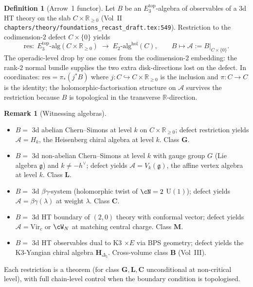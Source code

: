 \documentclass[11pt]{article}
\theoremstyle{definition}
\newtheorem{defn}[thm]{Definition}
\newtheorem{rem}[thm]{Remark}
\theoremstyle{remark}
\newcommand{\bR}{\mathbb{R}}
\newcommand{\cA}{\mathcal{A}}
\newcommand{\fg}{\mathfrak{g}}
\newcommand{\Etwo}{E_2}
\newcommand{\Ethree}{E_3}
\begin{document}
\begin{defn}[Arrow~1 functor]
Let $B$ be an $\Ethree^{\mathrm{top}}$-algebra of observables of a
$3$d HT theory on the slab $C \times \bR_{\geq 0}$ (Vol~II
\texttt{chapters/theory/foundations\_recast\_draft.tex:549}).
Restriction to the codimension-$2$ defect $C \times \{0\}$
yields
\[
\mathrm{res}\colon\;
\Ethree^{\mathrm{top}}\text{-alg}(C \times \bR_{\geq 0})
\;\longrightarrow\;
\Etwo\text{-alg}^{\mathrm{hol}}(C),
\qquad
B \longmapsto \cA := B|_{C \times \{0\}}.
\]
The operadic-level drop by one comes from the codimension-$2$
embedding: the rank-$2$ normal bundle supplies the two extra
disk-directions lost on the defect. In coordinates:
$\mathrm{res} = \pi_*(j^* B)$ where $j\colon C \hookrightarrow
C \times \bR_{\geq 0}$ is the inclusion and $\pi\colon C \to C$
is the identity; the holomorphic-factorisation structure on
$\cA$ survives the restriction because $B$ is topological in the
transverse $\bR$-direction.
\end{defn}

\begin{rem}[Witnessing algebras]
\begin{itemize}
\item $B = $ $3$d abelian Chern--Simons at level $k$ on
$C \times \bR_{\geq 0}$; defect restriction yields
$\cA = H_k$, the Heisenberg chiral algebra at level $k$.
Class $\mathbf{G}$.
\item $B = $ $3$d non-abelian Chern--Simons at level $k$ with
gauge group $G$ (Lie algebra $\fg$) and $k \neq -h^\vee$;
defect yields $\cA = V_k(\fg)$, the affine vertex algebra at
level $k$. Class $\mathbf{L}$.
\item $B = $ $3$d $\beta\gamma$-system (holomorphic twist of
$\cN = 2$ $\mathrm{U}(1)$); defect yields
$\cA = \beta\gamma(\lambda)$ at weight $\lambda$. Class
$\mathbf{C}$.
\item $B = $ $3$d HT boundary of $(2, 0)$ theory with conformal
vector; defect yields $\cA = \mathrm{Vir}_c$ or $\cW_N$ at
matching central charge. Class $\mathbf{M}$.
\item $B = $ $3$d HT observables dual to K3 $\times E$ via
BPS geometry; defect yields the K3-Yangian chiral algebra
$\mathbf{H}_{\Delta_5}$. Cross-volume class $\mathbf{B}$
(Vol~III).
\end{itemize}
Each restriction is a theorem (for class $\mathbf{G, L, C}$
unconditional at non-critical level), with full chain-level
control when the boundary condition is topologised.
\end{rem}
\end{document}
